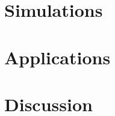 \documentclass[12pt]{article}
\begin{document}
\section{Simulations}
\label{sec:simu}

\section{Applications}
\label{sec:appl}

\section{Discussion}
\label{sec:conc}


\bigskip







\end{document}

